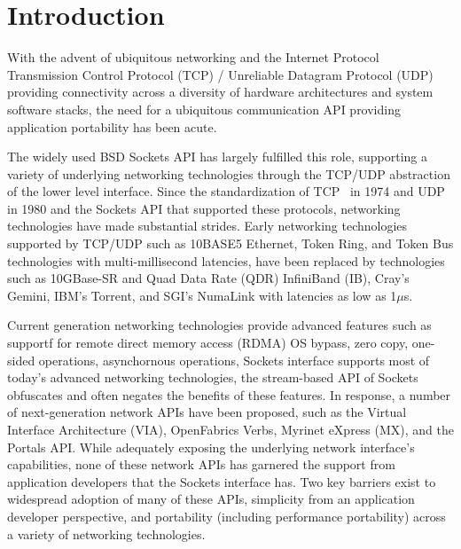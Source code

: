 \section{Introduction}
\label{sec:introduction}


With the advent of ubiquitous networking and the Internet
Protocol~\cite{RFC791}
Transmission Control Protocol (TCP) / Unreliable Datagram Protocol
(UDP) providing connectivity across a diversity of hardware
architectures and system software stacks, the need for a ubiquitous
communication API providing application portability has been acute.

The widely used BSD Sockets API has largely fulfilled this
role, supporting a variety of underlying networking technologies
through the TCP/UDP abstraction of the lower level interface. Since
the standardization of TCP~\cite{tcp-rfc-675} in 1974 and
UDP~\cite{udp-rfc-768} in 1980 and the Sockets API that supported these
protocols, networking technologies have made substantial
strides. Early networking technologies supported by TCP/UDP such as
10BASE5 Ethernet, Token Ring, and Token Bus technologies with
multi-millisecond latencies, have been replaced by technologies such
as 10GBase-SR and Quad Data Rate (QDR) InfiniBand (IB), Cray's Gemini,
IBM's Torrent, and SGI's NumaLink with latencies as low as 1$\mu$s.

Current generation networking technologies provide advanced features
such as supportf for remote direct memory access (RDMA) OS bypass,
zero copy, one-sided operations, asynchornous operations,
Sockets interface supports most of today's advanced networking
technologies, 
the stream-based API of Sockets obfuscates and often
negates the benefits of these features. In response, a number of
next-generation network APIs have been proposed, such as the Virtual
Interface Architecture (VIA), OpenFabrics Verbs, Myrinet eXpress (MX),
and the Portals API. While adequately exposing the underlying network
interface's capabilities, none of these network APIs has garnered the
support from application developers that the Sockets interface
has. Two key barriers exist to widespread adoption of many of these
APIs, simplicity from an application developer perspective, and
portability (including performance portability) across a variety of
networking technologies.

